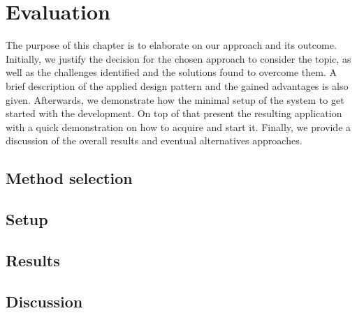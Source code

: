 \chapter{Evaluation}\label{ch:eval}
The purpose of this chapter is to elaborate on our approach and its outcome. Initially, we justify the decision for the chosen approach to consider the topic, as well as the challenges identified and the solutions found to overcome them. A brief description of the applied design pattern and the gained advantages is also given. Afterwards, we demonstrate how the minimal setup of the system to get started with the development. On top of that present the resulting application with a quick demonstration on how to acquire and start it. Finally, we provide a discussion of the overall results and eventual alternatives approaches.
\section{Method selection}\label{sec:meth}
\section{Setup}\label{sec:setup}
\section{Results}\label{sec:res}
\section{Discussion}\label{sec:disc}